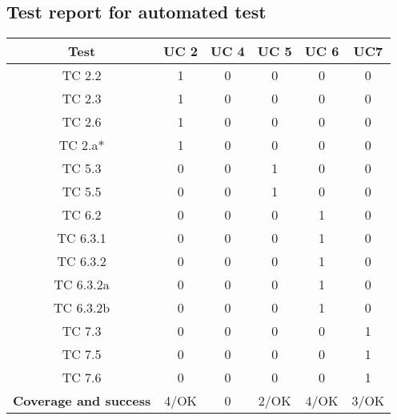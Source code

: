 \documentclass[12pt, letterpaper]{article}
\begin{document}
\subsection{Test report for automated test}\label{matrix}
\begin{center}
	\begin{tabular}{|c|c|c|c|c|c|} 
		\hline
		\textbf{Test} & \textbf{UC 2} & \textbf{UC 4} & \textbf{UC 5} & \textbf{UC 6} & \textbf{UC7} \\ [0.5ex] 
		\hline\hline
		TC 2.2 & 1 & 0 & 0 & 0 & 0 \\
		\hline
		TC 2.3 & 1 & 0 & 0 & 0 & 0 \\
		\hline 
		TC 2.6 & 1 & 0 & 0 & 0 & 0 \\
		\hline 
		TC 2.a* & 1 & 0 & 0 & 0 & 0\\
		\hline
		TC 5.3 & 0 & 0 & 1 & 0 & 0\\ 
		\hline
		TC 5.5 & 0 & 0 & 1 & 0 & 0\\ 
		\hline
		TC 6.2 & 0 & 0 & 0 & 1 & 0\\ 
		\hline
		TC 6.3.1 & 0 & 0 & 0 & 1 & 0\\ 
		\hline
		TC 6.3.2 & 0 & 0 & 0 & 1 & 0\\ 
		\hline
		TC 6.3.2a & 0 & 0 & 0 & 1 & 0\\ 
		\hline
		TC 6.3.2b & 0 & 0 & 0 & 1 & 0\\
		\hline
		TC 7.3 & 0 & 0 & 0 & 0 & 1\\ 
		\hline
		TC 7.5 & 0 & 0 & 0 & 0 & 1\\ 
		\hline
		TC 7.6 & 0 & 0 & 0 & 0 & 1\\ 		
		\hline
		\textbf{Coverage and success} & 4/OK & 0 & 2/OK & 4/OK & 3/OK \\[1ex]
		\hline 
	\end{tabular}
\end{center}
\end{document}

